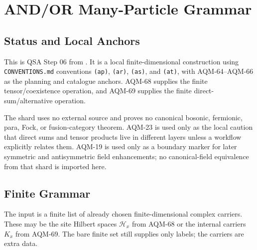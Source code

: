 
\section{AND/OR Many-Particle Grammar}
\label{sec:qsa-and-or-many-particle-grammar}

\subsection{Status and Local Anchors}

This is QSA Step 06 from
.  It is a local
finite-dimensional construction using \texttt{CONVENTIONS.md} conventions
\texttt{(ap)}, \texttt{(ar)}, \texttt{(as)}, and \texttt{(at)}, with
AQM-64--AQM-66 as the planning and catalogue anchors.  AQM-68 supplies the
finite tensor/coexistence operation, and AQM-69 supplies the finite
direct-sum/alternative operation.

The shard uses no external source and proves no canonical bosonic, fermionic,
para, Fock, or fusion-category theorem.  AQM-23 is used only as the local
caution that direct sums and tensor products live in different layers unless a
workflow explicitly relates them.  AQM-19 is used only as a boundary marker
for later symmetric and antisymmetric field enhancements; no canonical-field
equivalence from that shard is imported here.

\subsection{Finite Grammar}

The input is a finite list of already chosen finite-dimensional complex
carriers.  These may be the site Hilbert spaces \(\mathcal H_x\) from AQM-68
or the internal carriers \(K_x\) from AQM-69.  The bare finite set still
supplies only labels; the carriers are extra data.

